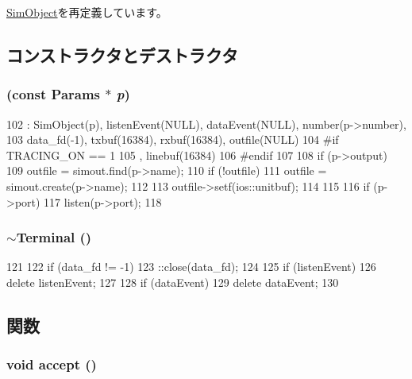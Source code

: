 \hyperlink{classSimObject_a0f0761d2db586a23bb2a2880b8f387bb}{SimObject}を再定義しています。

\subsection{コンストラクタとデストラクタ}
\hypertarget{classTerminal_af67625ef23fe68d37a4fc8536c093b9f}{
\subsubsection[{Terminal}]{ (const {\bf Params} $\ast$ {\em p})}}
\label{classTerminal_af67625ef23fe68d37a4fc8536c093b9f}



\begin{DoxyCode}
102     : SimObject(p), listenEvent(NULL), dataEvent(NULL), number(p->number),
103       data_fd(-1), txbuf(16384), rxbuf(16384), outfile(NULL)
104 #if TRACING_ON == 1
105       , linebuf(16384)
106 #endif
107 {
108     if (p->output) {
109         outfile = simout.find(p->name);
110         if (!outfile)
111             outfile = simout.create(p->name);
112 
113         outfile->setf(ios::unitbuf);
114     }
115 
116     if (p->port)
117         listen(p->port);
118 }
\end{DoxyCode}
\hypertarget{classTerminal_a8495caff1d8ed60c107a562c9ceccbf3}{
\subsubsection[{$\sim$Terminal}]{\setlength{\rightskip}{0pt plus 5cm}$\sim${\bf Terminal} ()}}
\label{classTerminal_a8495caff1d8ed60c107a562c9ceccbf3}



\begin{DoxyCode}
121 {
122     if (data_fd != -1)
123         ::close(data_fd);
124 
125     if (listenEvent)
126         delete listenEvent;
127 
128     if (dataEvent)
129         delete dataEvent;
130 }
\end{DoxyCode}


\subsection{関数}
\hypertarget{classTerminal_aadb9f3b844fb4cf98288cd3c60a3af91}{
\subsubsection[{accept}]{\setlength{\rightskip}{0pt plus 5cm}void accept ()}}
\label{classTerminal_aadb9f3b844fb4cf98288cd3c60a3af91}



